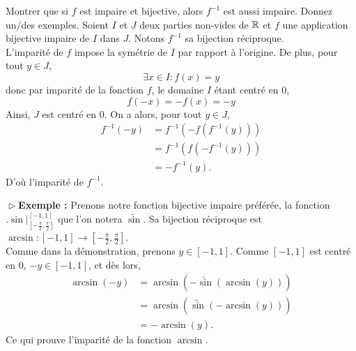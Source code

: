 \documentclass{article}
\renewenvironment{question_kholle}[2][ ]
{
	\subsection{\texorpdfstring{#2}{}}
	\notblank{#1}
	{
		\noindent #1
		\bigbreak
	}
	{}
	\begin{proof}
}
{
	\end{proof}
}
\begin{document}
\begin{question_kholle}{Montrer que si $f$ est impaire et bijective, alors $f^{-1}$ est aussi impaire. Donnez un/des exemples.}
  Soient $I$ et $J$ deux parties non-vides de $\mathbb R$ et $f$ une application bijective impaire de $I$ dans $J$. Notons $f^{-1}$ sa bijection réciproque.\\
  L'imparité de $f$ impose la symétrie de $I$ par rapport à l'origine. De plus, pour tout $y\in J$,
  \[
    \exists{x}\in I: f(x)=y
  \]
  donc par imparité de la fonction $f$, le domaine $I$ étant centré en $0$,
  \[
    f(-x)=-f(x)=-y
  \]
  Ainsi, $J$ est centré en $0$. On a alors, pour tout $y\in J$,
  \begin{align*}
    f^{-1}(-y) & = f^{-1}(-f(f^{-1}(y))) \\
               & = f^{-1}(f(-f^{-1}(y))) \\
               & = -f^{-1}(y).
  \end{align*}
  D'où l'imparité de $f^{-1}$.

  \noindent $\vartriangleright$\textbf{Exemple :} Prenons notre fonction bijective impaire préférée, la fonction $\bigl.\sin\bigr|_{\left[ -\frac{\pi}{2}, \frac{\pi}{2}\right]}^{[-1,1]}$ que l'on notera $\widetilde{\sin}$. Sa bijection réciproque est $\arcsin : [-1,1] \to \left[ -\frac{\pi}{2}, \frac{\pi}{2}\right]$.\\
  Comme dans la démonstration, prenons $y\in [-1, 1]$. Comme $[-1,1]$ est centré en $0$, $-y\in [-1,1]$, et dès lors,
  \begin{align*}
    \arcsin(-y) & = \arcsin(-\widetilde{\sin}(\arcsin(y))) \\
                & = \arcsin(\widetilde{\sin}(-\arcsin(y))) \\
                & = -\arcsin(y).
  \end{align*}
  Ce qui prouve l'imparité de la fonction $\arcsin$.
\end{question_kholle}
\end{document}
